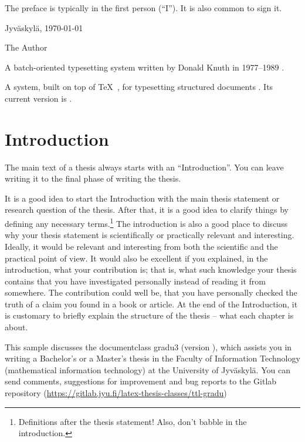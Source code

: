 \documentclass[utf8,english]{gradu3}
\begin{document}
The preface is typically in the first person (``I'').  It is also common
to sign it.

Jyväskylä, \today

\bigskip

The Author

\begin{thetermlist}
\item[\TeX] A batch-oriented typesetting system written by 
Donald Knuth in 1977--1989 \parencite[see][]{knuth86:_texbook}. 
\item[\LaTeX] A system, built on top of \TeX\
  \parencite{knuth86:_texbook}, for typesetting structured
  documents \parencite[see][]{lamport94:_latex}.  Its current version
  is \LaTeXe.
\end{thetermlist}

\mainmatter

\chapter{Introduction}

The main text of a thesis always starts with an ``Introduction''.
You can leave writing it to the final phase of writing the thesis.

It is a good idea to start the Introduction with the main thesis
statement or research question of the thesis.  After that, it is a
good idea to clarify things by defining any necessary
terms.\footnote{Definitions after the thesis statement!  Also, don't
  babble in the introduction.}  The introduction is also a good place
to discuss why your thesis statement is scientifically or practically
relevant and interesting.  Ideally, it would be relevant and
interesting from both the scientific and the practical point of view.
It would also be excellent if you explained, in the introduction, what
your contribution is; that is, what such knowledge your thesis
contains that you have investigated personally instead of reading it
from somewhere.  The contribution could well be, that you have
personally checked the truth of a claim you found in a book or
article.  At the end of the Introduction, it is customary to briefly
explain the structure of the thesis -- what each chapter is about.

This sample discusses the documentclass gradu3 (version
\graduclsversion), which assists you in writing a Bachelor's or a
Master's thesis in the Faculty of Information Technology
(mathematical information technology) at the University of Jyväskylä.
You can send comments, suggestions for improvement and bug reports to
the Gitlab repository
(\url{https://gitlab.jyu.fi/latex-thesis-classes/ttl-gradu})
\end{document}
